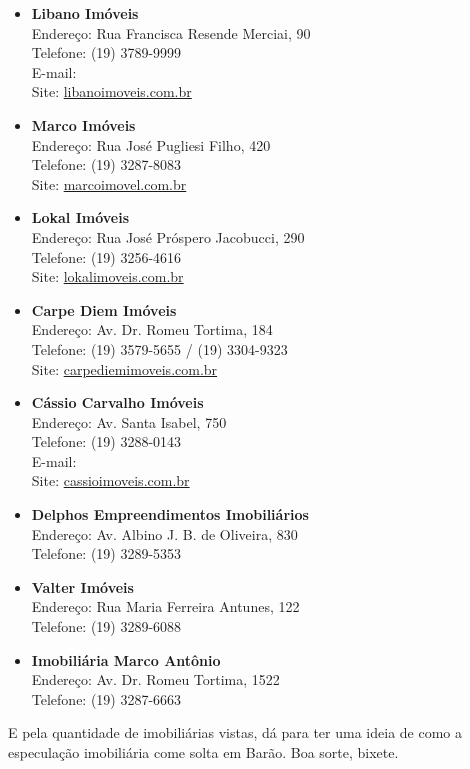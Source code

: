 \begin{itemize}
    \item   \textbf{Libano Imóveis}
        \\Endereço: Rua Francisca Resende Merciai, 90
        \\Telefone: (19) 3789-9999
        \\E-mail: 
        \\Site: \url{libanoimoveis.com.br}

    \item   \textbf{Marco Imóveis}
        \\Endereço: Rua José Pugliesi Filho, 420
        \\Telefone: (19) 3287-8083
        \\Site: \url{marcoimovel.com.br}

    \item   \textbf{Lokal Imóveis}
        \\Endereço: Rua José Próspero Jacobucci, 290
        \\Telefone: (19) 3256-4616
        \\Site: \url{lokalimoveis.com.br}

    \item   \textbf{Carpe Diem Imóveis}
        \\Endereço: Av. Dr. Romeu Tortima, 184
        \\Telefone: (19) 3579-5655 / (19) 3304-9323
        \\Site: \url{carpediemimoveis.com.br}

    \item   \textbf{Cássio Carvalho Imóveis}
        \\Endereço: Av. Santa Isabel, 750
        \\Telefone: (19) 3288-0143
        \\E-mail: 
        \\Site: \url{cassioimoveis.com.br}

    \item   \textbf{Delphos Empreendimentos Imobiliários}
        \\Endereço: Av. Albino J. B. de Oliveira, 830
        \\Telefone: (19) 3289-5353

    \item   \textbf{Valter Imóveis}
        \\Endereço: Rua Maria Ferreira Antunes, 122
        \\Telefone: (19) 3289-6088

    \item   \textbf{Imobiliária Marco Antônio}
        \\Endereço: Av. Dr. Romeu Tortima, 1522
        \\Telefone: (19) 3287-6663

\end{itemize}

E pela quantidade de imobiliárias vistas, dá para ter uma ideia de como a
especulação imobiliária come solta em Barão. Boa sorte, bixete.
